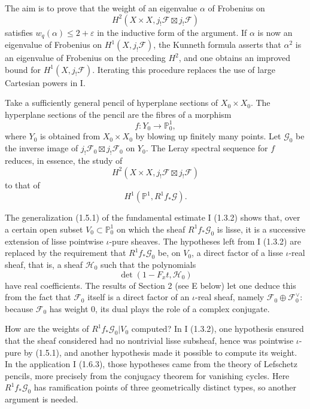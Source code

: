 \documentclass[11pt]{article}
\theoremstyle{remark}
\begin{document}
The aim is to prove that the weight of an eigenvalue $\alpha$ of Frobenius on
\[
H^2(X\times X,j_{!}\mathcal F\boxtimes j_{!}\mathcal F)
\]
satisfies $w_q(\alpha)\le 2+\varepsilon$ in the inductive form of the argument. If $\alpha$ is now an eigenvalue of Frobenius on $H^1(X,j_{!}\mathcal F)$, the Kunneth formula asserts that $\alpha^2$ is an eigenvalue of Frobenius on the preceding $H^2$, and one obtains an improved bound for $H^1(X,j_{!}\mathcal F)$. Iterating this procedure replaces the use of large Cartesian powers in I.

Take a sufficiently general pencil of hyperplane sections of $X_0\times X_0$. The hyperplane sections of the pencil are the fibres of a morphism
\[
f:Y_0\longrightarrow \mathbb P^1_0,
\]
where $Y_0$ is obtained from $X_0\times X_0$ by blowing up finitely many points. Let $\mathcal G_0$ be the inverse image of $j_{!}\mathcal F_0\boxtimes j_{!}\mathcal F_0$ on $Y_0$. The Leray spectral sequence for $f$ reduces, in essence, the study of
\[
H^2(X\times X,j_{!}\mathcal F\boxtimes j_{!}\mathcal F)
\]
to that of
\[
H^1(\mathbb P^1,R^1 f_{*}\mathcal G).
\]

The generalization (1.5.1) of the fundamental estimate I (1.3.2) shows that, over a certain open subset $V_0\subset \mathbb P^1_0$ on which the sheaf $R^1f_{*}\mathcal G_0$ is lisse, it is a successive extension of lisse pointwise $\iota$-pure sheaves. The hypotheses left from I (1.3.2) are replaced by the requirement that $R^1f_{*}\mathcal G_0$ be, on $V_0$, a direct factor of a lisse $\iota$-real sheaf, that is, a sheaf $\mathcal H_0$ such that the polynomials
\[
\det(1-F_xt,\mathcal H_0)
\]
have real coefficients. The results of Section 2 (see E below) let one deduce this from the fact that $\mathcal F_0$ itself is a direct factor of an $\iota$-real sheaf, namely $\mathcal F_0\oplus\mathcal F_0^\vee$: because $\mathcal F_0$ has weight $0$, its dual plays the role of a complex conjugate.

How are the weights of $R^1f_{*}\mathcal G_0|V_0$ computed? In I (1.3.2), one hypothesis ensured that the sheaf considered had no nontrivial lisse subsheaf, hence was pointwise $\iota$-pure by (1.5.1), and another hypothesis made it possible to compute its weight. In the application I (1.6.3), those hypotheses came from the theory of Lefschetz pencils, more precisely from the conjugacy theorem for vanishing cycles. Here $R^1f_{*}\mathcal G_0$ has ramification points of three geometrically distinct types, so another argument is needed.
\end{document}

